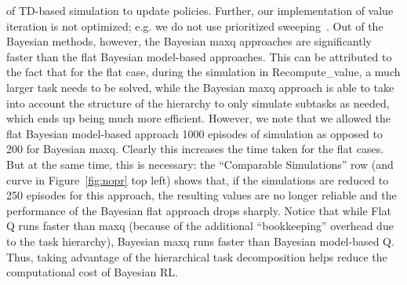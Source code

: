 of TD-based simulation to update policies. Further, our implementation
of value iteration is not optimized; e.g. we do not use prioritized
sweeping~\cite{mooreatkeson93}. Out of the Bayesian methods, however,
the Bayesian {\sc maxq} approaches are significantly faster than the
flat Bayesian model-based approaches. This can be attributed to the
fact that for the flat case, during the simulation in {\sc
Recompute\_value}, a much larger task needs to be solved, while the
Bayesian {\sc maxq} approach is able to take into account the
structure of the hierarchy to only simulate subtasks as needed, which
ends up being much more efficient. However, we note that we allowed
the flat Bayesian model-based approach 1000 episodes of simulation as
opposed to 200 for Bayesian {\sc maxq}. Clearly this increases the
time taken for the flat cases. But at the same time, this is
necessary: the ``Comparable Simulations'' row (and curve in
Figure~\ref{fig:nopr} top left) shows that, if the simulations are
reduced to 250 episodes for this approach, the resulting values are no
longer reliable and the performance of the Bayesian flat approach
drops sharply.  Notice that while Flat Q runs faster than {\sc maxq}
(because of the additional ``bookkeeping'' overhead due to the task hierarchy),
Bayesian {\sc maxq} runs faster than Bayesian model-based Q. Thus,
taking advantage of the hierarchical task decomposition helps reduce
the computational cost of Bayesian RL.


						
